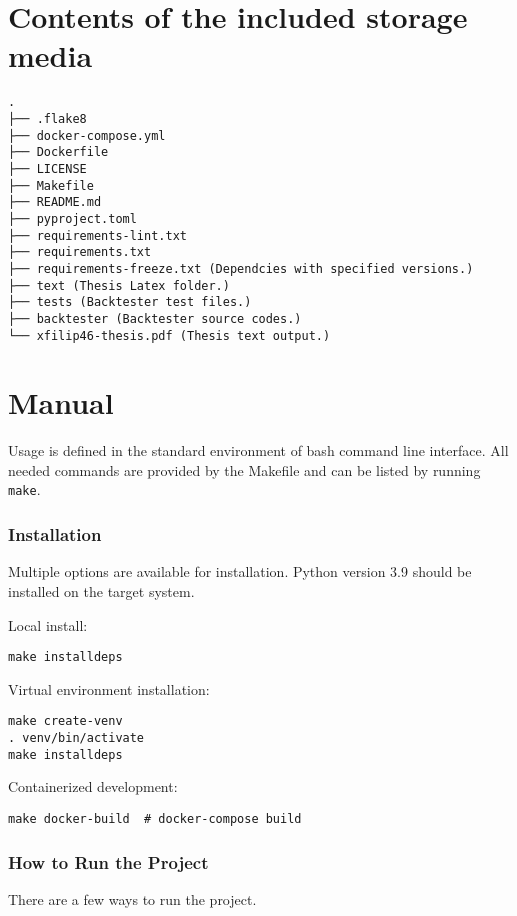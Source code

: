 


\chapter{Contents of the included storage media}
\begin{verbatim}
.
├── .flake8
├── docker-compose.yml
├── Dockerfile
├── LICENSE
├── Makefile
├── README.md
├── pyproject.toml
├── requirements-lint.txt
├── requirements.txt
├── requirements-freeze.txt (Dependcies with specified versions.)
├── text (Thesis Latex folder.)
├── tests (Backtester test files.)
├── backtester (Backtester source codes.)
└── xfilip46-thesis.pdf (Thesis text output.)
\end{verbatim}


\chapter{Manual}
Usage is defined in the standard environment of bash command line interface. All needed commands are provided by the Makefile and can be listed by running \texttt{make}.

\subsection*{Installation}
Multiple options are available for installation. Python version 3.9 should be installed on the target system.

Local install:
\begin{verbatim}
make installdeps
\end{verbatim}

Virtual environment installation:
\begin{verbatim}
make create-venv
. venv/bin/activate
make installdeps
\end{verbatim}

Containerized development:
\begin{verbatim}
make docker-build  # docker-compose build
\end{verbatim}

\subsection*{How to Run the Project}
There are a few ways to run the project.

